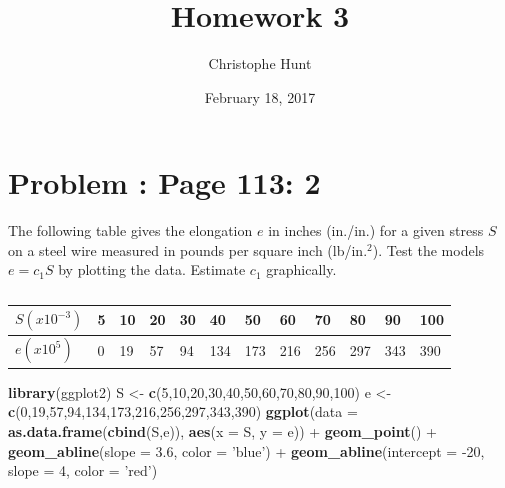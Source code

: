 \documentclass[]{article}
\title{Homework 3}
\author{Christophe Hunt}
\date{February 18, 2017}
\newenvironment{Shaded}{\begin{snugshade}}{\end{snugshade}}
\newcommand{\KeywordTok}[1]{\textcolor[rgb]{0.13,0.29,0.53}{\textbf{{#1}}}}
\newcommand{\DataTypeTok}[1]{\textcolor[rgb]{0.13,0.29,0.53}{{#1}}}
\newcommand{\DecValTok}[1]{\textcolor[rgb]{0.00,0.00,0.81}{{#1}}}
\newcommand{\FloatTok}[1]{\textcolor[rgb]{0.00,0.00,0.81}{{#1}}}
\newcommand{\StringTok}[1]{\textcolor[rgb]{0.31,0.60,0.02}{{#1}}}
\newcommand{\NormalTok}[1]{{#1}}
\begin{document}
\maketitle

{
\setcounter{tocdepth}{2}
\tableofcontents
}
\newpage

\section{Problem : Page 113: 2}\label{problem-page-113-2}

The following table gives the elongation \(e\) in inches (in./in.) for a
given stress \(S\) on a steel wire measured in pounds per square inch
(lb/in.\(^2\)). Test the models \(e = c_1S\) by plotting the data.
Estimate \(c_1\) graphically.

\begin{table}[!htbp]
\centering
\caption{}
\label{my-label}
\begin{tabular}{l|lllllllllll}
$S(x10^{-3})$ & 5 & 10 & 20 & 30 & 40  & 50  & 60  & 70  & 80  & 90  & 100 \\ \hline
$e(x10^5)$    & 0 & 19 & 57 & 94 & 134 & 173 & 216 & 256 & 297 & 343 & 390 
\end{tabular}
\end{table}

\begin{Shaded}
\begin{Highlighting}[]
\KeywordTok{library}\NormalTok{(ggplot2)}
\NormalTok{S <-}\StringTok{ }\KeywordTok{c}\NormalTok{(}\DecValTok{5}\NormalTok{,}\DecValTok{10}\NormalTok{,}\DecValTok{20}\NormalTok{,}\DecValTok{30}\NormalTok{,}\DecValTok{40}\NormalTok{,}\DecValTok{50}\NormalTok{,}\DecValTok{60}\NormalTok{,}\DecValTok{70}\NormalTok{,}\DecValTok{80}\NormalTok{,}\DecValTok{90}\NormalTok{,}\DecValTok{100}\NormalTok{)}
\NormalTok{e <-}\StringTok{ }\KeywordTok{c}\NormalTok{(}\DecValTok{0}\NormalTok{,}\DecValTok{19}\NormalTok{,}\DecValTok{57}\NormalTok{,}\DecValTok{94}\NormalTok{,}\DecValTok{134}\NormalTok{,}\DecValTok{173}\NormalTok{,}\DecValTok{216}\NormalTok{,}\DecValTok{256}\NormalTok{,}\DecValTok{297}\NormalTok{,}\DecValTok{343}\NormalTok{,}\DecValTok{390}\NormalTok{)}
\KeywordTok{ggplot}\NormalTok{(}\DataTypeTok{data =} \KeywordTok{as.data.frame}\NormalTok{(}\KeywordTok{cbind}\NormalTok{(S,e)), }\KeywordTok{aes}\NormalTok{(}\DataTypeTok{x =} \NormalTok{S, }\DataTypeTok{y =} \NormalTok{e)) +}\StringTok{ }
\StringTok{  }\KeywordTok{geom_point}\NormalTok{() +}
\StringTok{  }\KeywordTok{geom_abline}\NormalTok{(}\DataTypeTok{slope =} \FloatTok{3.6}\NormalTok{, }\DataTypeTok{color =} \StringTok{'blue'}\NormalTok{) +}\StringTok{ }
\StringTok{  }\KeywordTok{geom_abline}\NormalTok{(}\DataTypeTok{intercept =} \NormalTok{-}\DecValTok{20}\NormalTok{, }\DataTypeTok{slope =} \DecValTok{4}\NormalTok{, }\DataTypeTok{color =} \StringTok{'red'}\NormalTok{)}
\end{Highlighting}
\end{Shaded}
\end{document}
